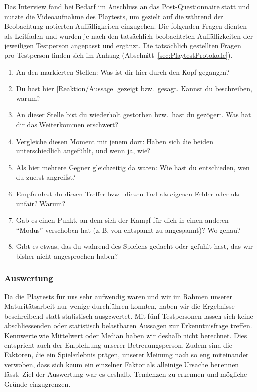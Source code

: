 \documentclass[../Main.tex]{subfiles}
\begin{document}
Das Interview fand bei Bedarf im Anschluss an das Post-Questionnaire statt und nutzte die Videoaufnahme des Playtests, um gezielt auf die während der Beobachtung notierten Auffälligkeiten einzugehen. Die folgenden Fragen dienten als Leitfaden und wurden je nach den tatsächlich beobachteten Auffälligkeiten der jeweiligen Testperson angepasst und ergänzt. Die tatsächlich gestellten Fragen pro Testperson finden sich im Anhang (Abschnitt~\ref{sec:PlaytestProtokolle}).

\begin{enumerate}[label=\textbf{I\arabic*}, leftmargin=1.5cm, itemsep=0.5em]
    \item An den markierten Stellen: Was ist dir hier durch den Kopf gegangen?
    \item Du hast hier [Reaktion/Aussage] gezeigt bzw.\ gesagt. Kannst du beschreiben, warum?
    \item An dieser Stelle bist du wiederholt gestorben bzw.\ hast du gezögert. Was hat dir das Weiterkommen erschwert?
    \item Vergleiche diesen Moment mit jenem dort: Haben sich die beiden unterschiedlich angefühlt, und wenn ja, wie?
    \item Als hier mehrere Gegner gleichzeitig da waren: Wie hast du entschieden, wen du zuerst angreifst?
    \item Empfandest du diesen Treffer bzw.\ diesen Tod als eigenen Fehler oder als unfair? Warum?
    \item Gab es einen Punkt, an dem sich der Kampf für dich in einen anderen \enquote{Modus} verschoben hat (z.\,B. von entspannt zu angespannt)? Wo genau?
    \item Gibt es etwas, das du während des Spielens gedacht oder gefühlt hast, das wir bisher nicht angesprochen haben?
\end{enumerate}

\subsubsection{Auswertung} \label{sec:Auswertung}
Da die Playtests für uns sehr aufwendig waren und wir im Rahmen unserer Maturitätsarbeit nur wenige durchführen konnten, haben wir die Ergebnisse beschreibend statt statistisch ausgewertet. Mit fünf Testpersonen lassen sich keine abschliessenden oder statistisch belastbaren Aussagen zur Erkenntnisfrage treffen. Kennwerte wie Mittelwert oder Median haben wir deshalb nicht berechnet. Dies entspricht auch der Empfehlung unserer Betreuungsperson. Zudem sind die Faktoren, die ein Spielerlebnis prägen, unserer Meinung nach so eng miteinander verwoben, dass sich kaum ein einzelner Faktor als alleinige Ursache benennen lässt. Ziel der Auswertung war es deshalb, Tendenzen zu erkennen und mögliche Gründe einzugrenzen.
\end{document}
